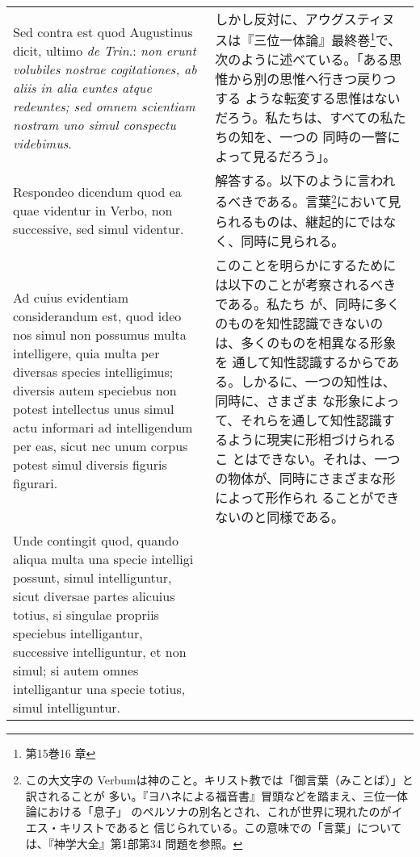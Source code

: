 \documentclass[10pt]{jsarticle} %
\begin{document}
\begin{longtable}{p{21em}p{21em}}
{\sc Sed contra est} quod Augustinus dicit, ultimo {\it de Trin}.:
 {\it non erunt volubiles nostrae cogitationes, ab aliis in alia
 euntes atque redeuntes; sed omnem scientiam nostram uno simul
 conspectu videbimus}.

&

しかし反対に、アウグスティヌスは『三位一体論』最終巻\footnote{第15巻16
章}で、次のように述べている。「ある思惟から別の思惟へ行きつ戻りつする
ような転変する思惟はないだろう。私たちは、すべての私たちの知を、一つの
同時の一瞥によって見るだろう」。

\\

{\sc Respondeo dicendum} quod ea quae videntur in Verbo, non
successive, sed simul videntur. 

&

解答する。以下のように言われるべきである。言葉\footnote{この大文字の
Verbumは神のこと。キリスト教では「御言葉（みことば）」と訳されることが
多い。『ヨハネによる福音書』冒頭などを踏まえ、三位一体論における「息子」
のペルソナの別名とされ、これが世界に現れたのがイエス・キリストであると
信じられている。この意味での「言葉」については、『神学大全』第1部第34
問題を参照。}において見られるものは、継起的にではなく、同時に見られる。

\\

Ad cuius evidentiam considerandum est,
quod ideo nos simul non possumus multa intelligere, quia multa per
diversas species intelligimus; diversis autem speciebus non potest
intellectus unus simul actu informari ad intelligendum per eas, sicut
nec unum corpus potest simul diversis figuris figurari. 

&

このことを明らかにするためには以下のことが考察されるべきである。私たち
が、同時に多くのものを知性認識できないのは、多くのものを相異なる形象を
通して知性認識するからである。しかるに、一つの知性は、同時に、さまざま
な形象によって、それらを通して知性認識するように現実に形相づけられるこ
とはできない。それは、一つの物体が、同時にさまざまな形によって形作られ
ることができないのと同様である。

\\

Unde contingit
quod, quando aliqua multa una specie intelligi possunt, simul
intelliguntur, sicut diversae partes alicuius totius, si singulae
propriis speciebus intelligantur, successive intelliguntur, et non
simul; si autem omnes intelligantur una specie totius, simul
intelliguntur. 


\end{longtable}
\end{document}
